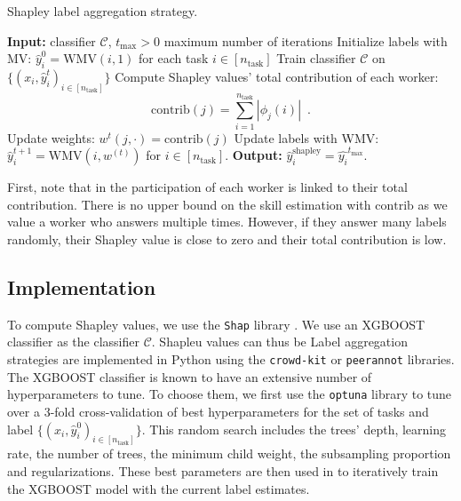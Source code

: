 \documentclass{cap2024}
\begin{document}
\begin{algorithm}[tbh]
  \caption{Shapley label aggregation strategy.}\label{alg:shap}
  \begin{algorithmic}[1]
    \State \textbf{Input:} classifier $\mathcal{C}$, $t_{\max}>0$ maximum number of iterations
  \State Initialize labels with MV: $\hat{y}_i^0 = \mathrm{WMV}(i, 1)$ for each task $i\in [n_\text{task}]$
        \State Train classifier $\mathcal{C}$ on $\{(x_i, \hat{y}_i^t)_{i\in [n_\text{task}]}\}$
        \State Compute Shapley values' total contribution of each worker:
        \[ \mathrm{contrib}(j) = \sum_{i=1}^{n_\text{task}} |\phi_{j}(i)|\enspace. \]
        \State Update weights: $w^t(j,\cdot) = \mathrm{contrib}(j)$
        \State Update labels with WMV: $\hat{y}_i^{t+1} = \mathrm{WMV}(i, w^{(t)})$ for $i\in[n_\text{task}]$.
    \EndFor
    \State \textbf{Output:} $\hat{y}_i^\text{shapley} = \hat{y_i}^{t_{\max}}$.
  \end{algorithmic}
  \end{algorithm}

First, note that in  the participation of each worker is linked to their total contribution. There is no upper bound on the skill estimation with $\mathrm{contrib}$ as we value a worker who answers multiple times.
However, if they answer many labels randomly, their Shapley value is close to zero and their total contribution is low.

\subsection{Implementation}
\label{sub:implementation}

To compute Shapley values, we use the \texttt{Shap} library \citep{NIPS2017_7062}.
We use an XGBOOST classifier \citep{chen2016xgboost} as the classifier $\mathcal{C}$.
Shapleu values can thus be
Label aggregation strategies are implemented in Python using the \texttt{crowd-kit} \citep{CrowdKit2023} or \texttt{peerannot} \citep{peerannot} libraries.
The XGBOOST classifier is known to have an extensive number of hyperparameters to tune.
To choose them, we first use the \texttt{optuna} \citep{optuna} library to tune over a $3$-fold cross-validation of best hyperparameters for the set of tasks and label $\{(x_i, \hat{y}_i^0)_{i\in [n_\text{task}]}\}$.
This random search includes the trees' depth, learning rate, the number of trees, the minimum child weight, the subsampling proportion and regularizations. These best parameters are then used in  to iteratively train the XGBOOST model with the current label estimates.
\end{document}
